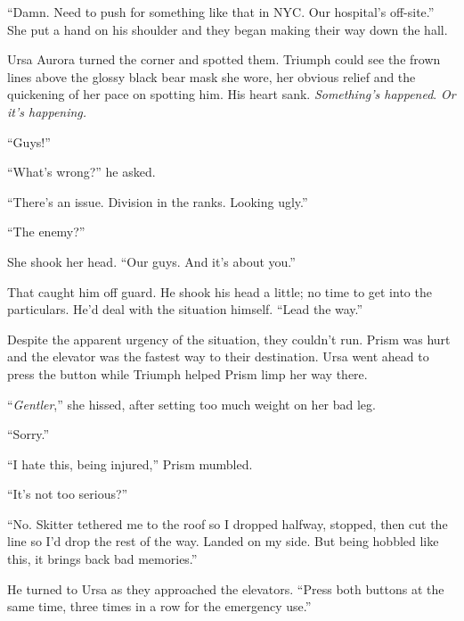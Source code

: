 ``Damn.  Need to push for something like that in NYC.  Our hospital's off-site.''  She put a hand on his shoulder and they began making their way down the hall.



Ursa Aurora turned the corner and spotted them.  Triumph could see the frown lines above the glossy black bear mask she wore, her obvious relief and the quickening of her pace on spotting him.  His heart sank. \emph{Something's happened}.  \emph{Or it's happening.}



``Guys!''



``What's wrong?'' he asked.



``There's an issue.  Division in the ranks.  Looking ugly.''



``The enemy?''



She shook her head.  ``Our guys.  And it's about you.''



That caught him off guard.  He shook his head a little; no time to get into the particulars.  He'd deal with the situation himself.  ``Lead the way.''



Despite the apparent urgency of the situation, they couldn't run.  Prism was hurt and the elevator was the fastest way to their destination.  Ursa went ahead to press the button while Triumph helped Prism limp her way there.



``\emph{Gentler},'' she hissed, after setting too much weight on her bad leg.



``Sorry.''



``I hate this, being injured,'' Prism mumbled.



``It's not too serious?''



``No.  Skitter tethered me to the roof so I dropped halfway, stopped, then cut the line so I'd drop the rest of the way.  Landed on my side.  But being hobbled like this, it brings back bad memories.''



He turned to Ursa as they approached the elevators.  ``Press both buttons at the same time, three times in a row for the emergency use.''



